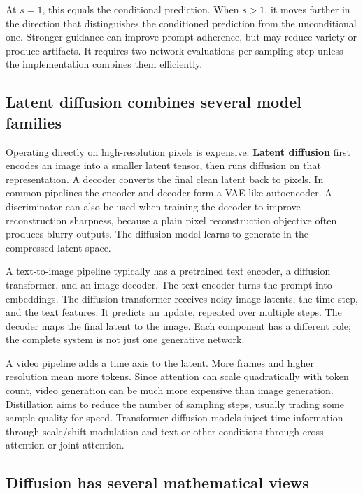 At \(s=1\), this equals the conditional prediction. When \(s>1\), it moves farther in the direction that distinguishes the conditioned prediction from the unconditional one. Stronger guidance can improve prompt adherence, but may reduce variety or produce artifacts. It requires two network evaluations per sampling step unless the implementation combines them efficiently.

\subsection{Latent diffusion combines several model families}\label{04-visual-computing-ii-ch031-latent-diffusion-combines-several-model-families}

\hypertarget{04-visual-computing-ii-ch031-latent-diffusion-combines-several-model-families}{}

Operating directly on high-resolution pixels is expensive. \textbf{Latent diffusion} first encodes an image into a smaller latent tensor, then runs diffusion on that representation. A decoder converts the final clean latent back to pixels. In common pipelines the encoder and decoder form a VAE-like autoencoder. A discriminator can also be used when training the decoder to improve reconstruction sharpness, because a plain pixel reconstruction objective often produces blurry outputs. The diffusion model learns to generate in the compressed latent space.

A text-to-image pipeline typically has a pretrained text encoder, a diffusion transformer, and an image decoder. The text encoder turns the prompt into embeddings. The diffusion transformer receives noisy image latents, the time step, and the text features. It predicts an update, repeated over multiple steps. The decoder maps the final latent to the image. Each component has a different role; the complete system is not just one generative network.

A video pipeline adds a time axis to the latent. More frames and higher resolution mean more tokens. Since attention can scale quadratically with token count, video generation can be much more expensive than image generation. Distillation aims to reduce the number of sampling steps, usually trading some sample quality for speed. Transformer diffusion models inject time information through scale/shift modulation and text or other conditions through cross-attention or joint attention.

\subsection{Diffusion has several mathematical views}\label{04-visual-computing-ii-ch031-diffusion-has-several-mathematical-views}

